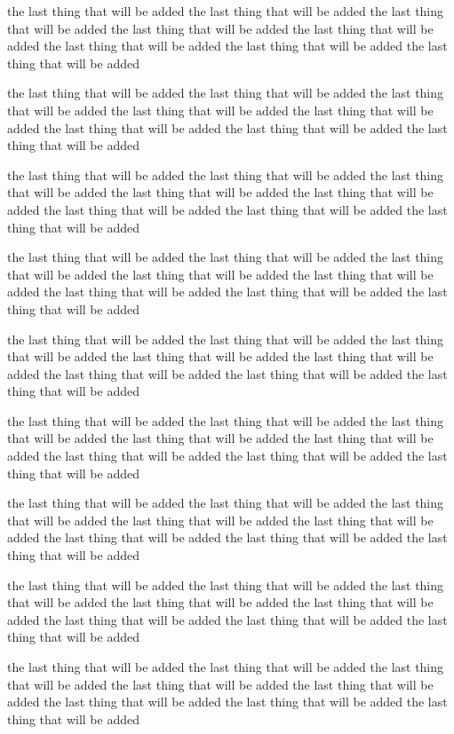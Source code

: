 \par{
the last thing that will be added
the last thing that will be added
the last thing that will be added
the last thing that will be added
the last thing that will be added
the last thing that will be added
the last thing that will be added
the last thing that will be added
}
\par{
the last thing that will be added
the last thing that will be added
the last thing that will be added
the last thing that will be added
the last thing that will be added
the last thing that will be added
the last thing that will be added
the last thing that will be added
}
\par{
the last thing that will be added
the last thing that will be added
the last thing that will be added
the last thing that will be added
the last thing that will be added
the last thing that will be added
the last thing that will be added
the last thing that will be added
}
\par{
the last thing that will be added
the last thing that will be added
the last thing that will be added
the last thing that will be added
the last thing that will be added
the last thing that will be added
the last thing that will be added
the last thing that will be added
}
\par{
the last thing that will be added
the last thing that will be added
the last thing that will be added
the last thing that will be added
the last thing that will be added
the last thing that will be added
the last thing that will be added
the last thing that will be added
}
\par{
the last thing that will be added
the last thing that will be added
the last thing that will be added
the last thing that will be added
the last thing that will be added
the last thing that will be added
the last thing that will be added
the last thing that will be added
}
\par{
the last thing that will be added
the last thing that will be added
the last thing that will be added
the last thing that will be added
the last thing that will be added
the last thing that will be added
the last thing that will be added
the last thing that will be added
}
\par{
the last thing that will be added
the last thing that will be added
the last thing that will be added
the last thing that will be added
the last thing that will be added
the last thing that will be added
the last thing that will be added
the last thing that will be added
}
\par{
the last thing that will be added
the last thing that will be added
the last thing that will be added
the last thing that will be added
the last thing that will be added
the last thing that will be added
the last thing that will be added
the last thing that will be added
}